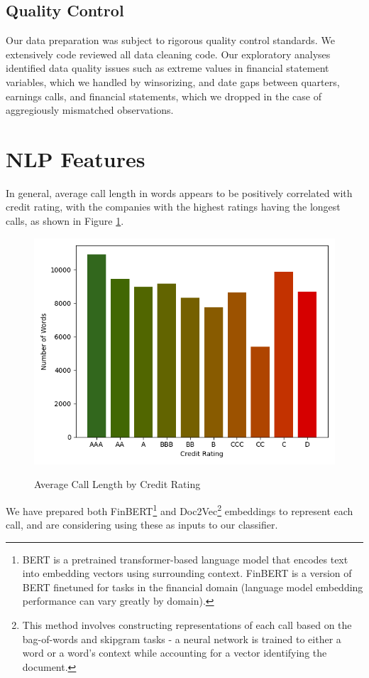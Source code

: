 \documentclass{article}[11pt]
\begin{document}
    \subsection*{Quality Control}

    Our data preparation was subject to rigorous quality control standards. We extensively code reviewed all data cleaning code. Our exploratory analyses identified data quality issues such as extreme values in financial statement variables, which we handled by winsorizing, and date gaps between quarters, earnings calls, and financial statements, which we dropped in the case of aggregiously mismatched observations. %

    \section*{NLP Features}

    In general, average call length in words appears to be positively correlated with credit rating, with the companies with the highest ratings having the longest calls, as shown in Figure \ref{fig:call-length-by-credit-rating}.
    
    \begin{figure}[h!]
		\centering
        \caption{Average Call Length by Credit Rating}
        \includegraphics[width=0.6\linewidth,keepaspectratio=true]{../Output/All Data EDA/NLP EDA/all_data_call_length_by_credit_rating_no_title.png}
        \label{fig:call-length-by-credit-rating}
	\end{figure}

    We have prepared both FinBERT\footnote{BERT is a pretrained transformer-based language model that encodes text into embedding vectors using surrounding context. FinBERT is a version of BERT finetuned for tasks in the financial domain (language model embedding performance can vary greatly by domain).} \citep{araci_finbert_2019} and Doc2Vec\footnote{This method involves constructing representations of each call based on the bag-of-words and skipgram tasks - a neural network is trained to either a word or a word's context while accounting for a vector identifying the document.} \citep{le_distributed_2014} embeddings to represent each call, and are considering using these as inputs to our classifier.
\end{document}
